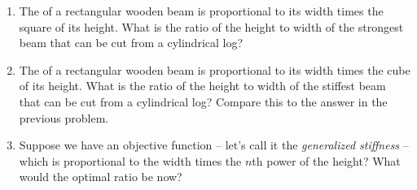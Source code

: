 \begin{ProblemSection}
  \begin{embeddedproblem-enumerate}
    \begin{enumerate}[label={\bf{}(\alph*)}]
    \item The  of a rectangular wooden
      beam is proportional to its width times the square of its
      height.  What is the ratio of the height to width of the
      strongest beam that can be cut from a cylindrical log?
    \item The  of a rectangular wooden beam is proportional
      to its width times the cube of its height.  What is the ratio of
      the height to width of the stiffest beam that can be cut from a
      cylindrical log?  Compare this to the answer in the previous
      problem.
    \item Suppose we have an  objective function -- let's call it
      the \emph{generalized stiffness} -- which is proportional
      to the width times the $n$th power of the height? What would the
      optimal ratio be now?
    \end{enumerate}
  \end{embeddedproblem-enumerate}


\end{ProblemSection}
